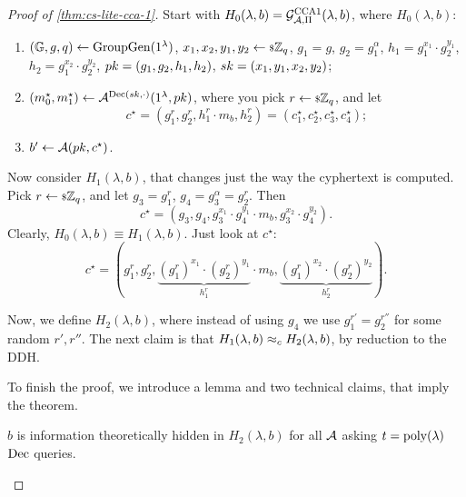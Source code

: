 \begin{proof}[Proof of \cref{thm:cs-lite-cca-1}]
	Start with $H_0(\lambda, b) = \mathcal{G}_{\mathcal{A}, \Pi}^{\text{CCA{1}}}(\lambda, b)$, where $H_0(\lambda, b)$:
	\begin{enumerate}
		\item
			$(\mathbb{G} , \allowbreak g , \allowbreak q) \leftarrow \mathrm{GroupGen}(1^{\lambda})$,
			$x_1, x_2, y_1, y_2 \leftarrow {\scriptstyle \$} {\mathbb{Z}_q}$,
			$g_1 = g$,
			$g_2 = g_1^{\alpha}$,
			$h_1 = g_1^{x_1} \cdot g_2^{y_1}$,
			$h_2 = g_1^{x_2} \cdot g_2^{y_2}$,
			$pk = (g_1, g_2, h_1, h_2)$,
			$sk = (x_1, y_1, x_2, y_2)$;
		\item $(m_0^{\star}, m_1^{\star}) \leftarrow \mathcal{A}^{\mathrm{Dec}(sk, \cdot)} (1^{\lambda}, pk)$, where you pick $r \leftarrow {\scriptstyle \$} {\mathbb{Z}_q}$, and let
			\begin{equation*}
				c^{\star} =
				(g_1^{r}, g_2^{r}, h_1^{r} \cdot m_b, h_2^{r}) =
				(c_1^{\star}, c_2^{\star}, c_3^{\star}, c_4^{\star});
			\end{equation*}
		\item $b' \leftarrow \mathcal{A}(pk, c^{\star})$.
	\end{enumerate}

	Now consider $H_1(\lambda, b)$, that changes just the way the cyphertext is computed.
	Pick $r \leftarrow {\scriptstyle \$} {\mathbb{Z}_q}$, and let $g_3 = g_1^r$, $g_4 = g_3^{\alpha} = g_2^{r}$.
	Then
	\begin{equation*}
		c^{\star} = \left(g_3, g_4, g_3^{x_1} \cdot g_4^{y_1} \cdot m_b, g_3^{x_2} \cdot g_4^{y_2}\right).
	\end{equation*}
	Clearly, $H_0(\lambda, b) \equiv H_1(\lambda, b)$.
	Just look at $c^{\star}$:
	\begin{equation*}
		c^{\star} =
		(g_1^{r}, g_2^{r}, \underbrace{(g_1^{r})^{x_1} \cdot (g_2^r)^{y_1}}_{h_1^{r}} \cdot m_b, \underbrace{(g_1^{r})^{x_2} \cdot (g_2^{r})^{y_2}}_{h_2^r}).
	\end{equation*}

	Now, we define $H_2(\lambda, b)$, where instead of using $g_4$ we use $g_1^{r'} = g_2^{r''}$ for some random $r', r''$.
	The next claim is that $H_1(\lambda, b) \approx_c H_2(\lambda, b)$, by reduction to the \ac{DDH}.

	To finish the proof, we introduce a lemma and two technical claims, that imply the theorem.

	\begin{lemma} \label{lem:cs-lite-cca-1}
		$b$ is information theoretically hidden in $H_2(\lambda, b)$ for all $\mathcal{A}$ asking $t = \mathrm{poly}(\lambda)$ $\mathrm{Dec}$ queries.
	\end{lemma}


\end{proof}
